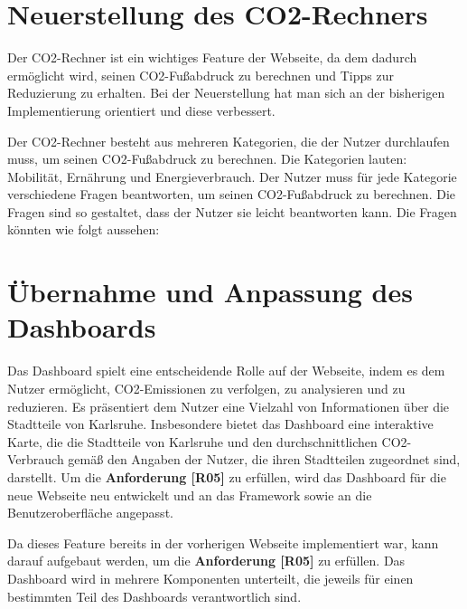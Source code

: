 \section{Neuerstellung des CO2-Rechners}


Der CO2-Rechner ist ein wichtiges Feature der Webseite, da dem dadurch ermöglicht wird, seinen CO2-Fußabdruck zu berechnen und Tipps zur Reduzierung zu erhalten.
Bei der Neuerstellung hat man sich an der bisherigen Implementierung orientiert und diese verbessert.

Der CO2-Rechner besteht aus mehreren Kategorien, die der Nutzer durchlaufen muss, um seinen CO2-Fußabdruck zu berechnen.
Die Kategorien lauten: Mobilität, Ernährung und Energieverbrauch.
Der Nutzer muss für jede Kategorie verschiedene Fragen beantworten, um seinen CO2-Fußabdruck zu berechnen.
Die Fragen sind so gestaltet, dass der Nutzer sie leicht beantworten kann.
Die Fragen könnten wie folgt aussehen:


\section{Übernahme und Anpassung des Dashboards}

Das Dashboard spielt eine entscheidende Rolle auf der Webseite, indem es dem Nutzer ermöglicht, CO2-Emissionen zu verfolgen, zu analysieren und zu reduzieren. Es präsentiert dem Nutzer eine Vielzahl von Informationen über die Stadtteile von Karlsruhe. Insbesondere bietet das Dashboard eine interaktive Karte, die die Stadtteile von Karlsruhe und den durchschnittlichen CO2-Verbrauch gemäß den Angaben der Nutzer, die ihren Stadtteilen zugeordnet sind, darstellt. Um die \textbf{Anforderung [R05]} zu erfüllen, wird das Dashboard für die neue Webseite neu entwickelt und an das Framework sowie an die Benutzeroberfläche angepasst.

Da dieses Feature bereits in der vorherigen Webseite implementiert war, kann darauf aufgebaut werden, um die \textbf{Anforderung [R05]} zu erfüllen. Das Dashboard wird in mehrere Komponenten unterteilt, die jeweils für einen bestimmten Teil des Dashboards verantwortlich sind.

